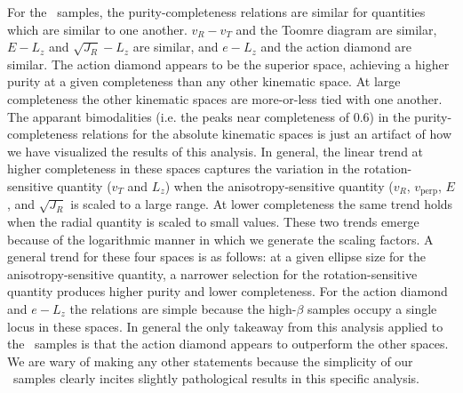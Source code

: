 For the \solar\ samples, the purity-completeness relations are similar for quantities which are similar to one another. $v_{R}-v_{T}$ and the Toomre diagram are similar, $E-L_{z}$ and $\sqrt{J_{R}}-L_{z}$ are similar, and $e-L_{z}$ and the action diamond are similar. The action diamond appears to be the superior space, achieving a higher purity at a given completeness than any other kinematic space. At large completeness the other kinematic spaces are more-or-less tied with one another. The apparant bimodalities (i.e. the peaks near completeness of 0.6) in the purity-completeness relations for the absolute kinematic spaces is just an artifact of how we have visualized the results of this analysis. In general, the linear trend at higher completeness in these spaces captures the variation in the rotation-sensitive quantity ($v_{T}$ and $L_{z}$) when the anisotropy-sensitive quantity ($v_{R}$, $v_\mathrm{perp}$, $E$, and $\sqrt{J_{R}}$ is scaled to a large range. At lower completeness the same trend holds when the radial quantity is scaled to small values. These two trends emerge because of the logarithmic manner in which we generate the scaling factors. A general trend for these four spaces is as follows: at a given ellipse size for the anisotropy-sensitive quantity, a narrower selection for the rotation-sensitive quantity produces higher purity and lower completeness. For the action diamond and $e-L_{z}$ the relations are simple because the high-$\beta$ samples occupy a single locus in these spaces. In general the only takeaway from this analysis applied to the \solar\ samples is that the action diamond appears to outperform the other spaces. We are wary of making any other statements because the simplicity of our \solar\ samples clearly incites slightly pathological results in this specific analysis. 

